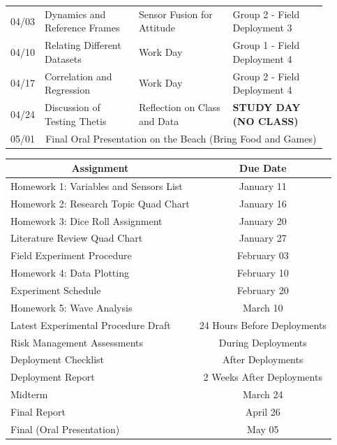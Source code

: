 \documentclass[
	letterpaper, %
	fontsize=10pt, %
	twoside=true, %
	numbers=noenddot, %
]{kaobook}
\begin{document}
\begin{table}[h!]
\begin{tabular}{ c | p{0.3\linewidth} | p{0.3\linewidth} | p{0.3\linewidth} }
        04/03   & Dynamics and Reference Frames     & Sensor Fusion for Attitude        & Group 2 - Field Deployment 3      \\
        04/10   & Relating Different Datasets       & Work Day                          & Group 1 - Field Deployment 4      \\
        04/17   & Correlation and Regression        & Work Day                          & Group 2 - Field Deployment 4      \\
        04/24   & Discussion of Testing Thetis      & Reflection on Class and Data      & \textbf{STUDY DAY (NO CLASS)}     \\
        \hline
        05/01   & \multicolumn{3}{c}{Final Oral Presentation on the Beach (Bring Food and Games)}                           \\
        \bottomrule
    \end{tabular}
\end{table}

\begin{table}[h!] 
    \begin{tabular}{ l | c }
        \toprule
        \multicolumn{1}{c|}{\textbf{Assignment}} & \textbf{Due Date} \\
        \midrule
        Homework 1: Variables and Sensors List          & January 11 \\
        Homework 2: Research Topic Quad Chart           & January 16 \\
        Homework 3: Dice Roll Assignment                & January 20 \\
        Literature Review Quad Chart\footnotemark[2]    & January 27 \\
        Field Experiment Procedure                      & February 03 \\
        Homework 4: Data Plotting                       & February 10 \\
        Experiment Schedule                             & February 20 \\
        Homework 5: Wave Analysis                       & March 10 \\
        Latest Experimental Procedure Draft             & 24 Hours Before Deployments \\
        Risk Management Assessments                     & During Deployments \\
        Deployment Checklist                            & After Deployments \\
        Deployment Report                               & 2 Weeks After Deployments \\
        Midterm                                         & March 24 \\
        Final Report                                    & April 26 \\
        Final (Oral Presentation)                       & May 05 \\
        \bottomrule
    \end{tabular}
\end{table}
\end{document}
